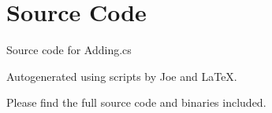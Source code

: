 \documentclass[12pt]{article}
\begin{document}
\maketitle
\pagebreak


\section{Source Code}

Source code for \textsf{Adding.cs}


\newpage



\newpage

Autogenerated using scripts by Joe and \LaTeX.

Please find the full source code and binaries included.
\end{document}
